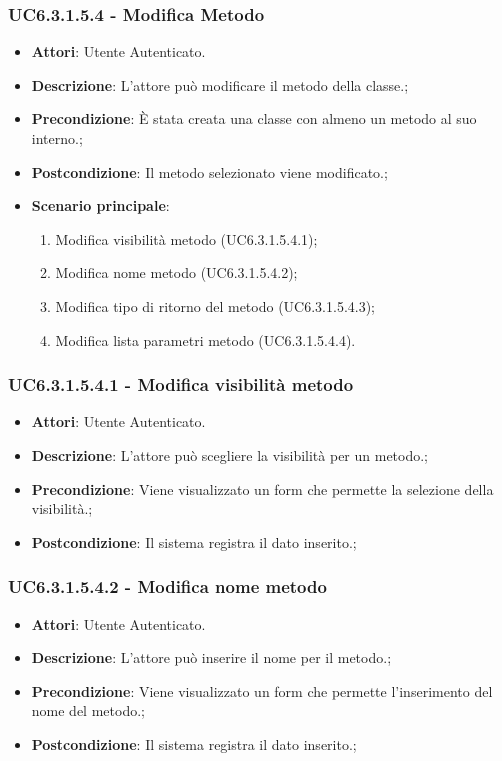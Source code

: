 \subsubsection{UC6.3.1.5.4 - Modifica Metodo} 
\label{sssec:UC6.3.1.5.4} 
\begin{itemize} 
\item \textbf{Attori}: Utente Autenticato.
\item \textbf{Descrizione}: L'attore può modificare il metodo della classe.;
\item \textbf{Precondizione}: È stata creata una classe con almeno un metodo al suo interno.;
\item \textbf{Postcondizione}: Il metodo selezionato viene modificato.;
\item \textbf{Scenario principale}: \begin{enumerate}\item Modifica visibilità metodo (UC6.3.1.5.4.1);\item Modifica nome metodo (UC6.3.1.5.4.2);\item Modifica tipo di ritorno del metodo (UC6.3.1.5.4.3);\item Modifica lista parametri metodo (UC6.3.1.5.4.4). 
 \end{enumerate}
\end{itemize} 
\subsubsection{UC6.3.1.5.4.1 - Modifica visibilità metodo} 
\label{sssec:UC6.3.1.5.4.1} 
\begin{itemize} 
\item \textbf{Attori}: Utente Autenticato.
\item \textbf{Descrizione}: L'attore può scegliere la visibilità per un metodo.;
\item \textbf{Precondizione}: Viene visualizzato un form che permette la selezione della visibilità.;
\item \textbf{Postcondizione}: Il sistema registra il dato inserito.;
\end{itemize} 
\subsubsection{UC6.3.1.5.4.2 - Modifica nome metodo} 
\label{sssec:UC6.3.1.5.4.2} 
\begin{itemize} 
\item \textbf{Attori}: Utente Autenticato.
\item \textbf{Descrizione}: L'attore può inserire il nome per il metodo.;
\item \textbf{Precondizione}: Viene visualizzato un form che permette l'inserimento del nome del metodo.;
\item \textbf{Postcondizione}: Il sistema registra il dato inserito.;
\end{itemize} 

